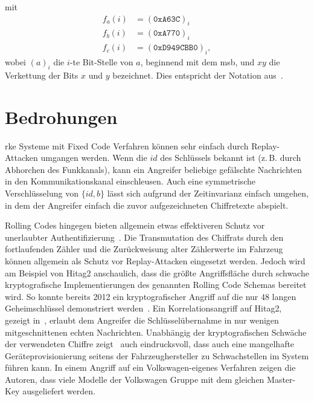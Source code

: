 %
mit
%
\begin{align*}
    f_{a}(i) & = {(\mathtt{0xA63C})}_{i}         \\
    f_{b}(i) & = {(\mathtt{0xA770})}_{i}         \\
    f_{c}(i) & = {(\mathtt{0xD949CBB0})}_{i} {,}
\end{align*}
%
wobei \({(a)}_{i}\) die \(i\)-te Bit-Stelle von \(a\), beginnend mit dem \gls{msb}, und \(x y\) die Verkettung der Bits \(x\) und \(y\) bezeichnet. Dies entspricht der Notation aus~\cite{Garcia2016,Verdult2015}.

\section{Bedrohungen}

\Gls{rke} Systeme mit \foreignlanguage{english}{Fixed Code} Verfahren können sehr einfach durch \foreignlanguage{english}{Replay}-Attacken umgangen werden. Wenn die \(\mathit{id}\) des Schlüssels bekannt ist (z.\,B. durch Abhorchen des Funkkanals), kann ein Angreifer beliebige gefälschte Nachrichten in den Kommunikationskanal einschleusen. Auch eine symmetrische Verschlüsselung von \( \{ \mathit{id}, b \} \) lässt sich aufgrund der Zeitinvarianz einfach umgehen, in dem der Angreifer einfach die zuvor aufgezeichneten Chiffretexte abspielt.

\foreignlanguage{english}{Rolling Codes} hingegen bieten allgemein etwas effektiveren Schutz vor unerlaubter Authentifizierung~\cite{Garcia2016}. Die Transmutation des Chiffrats durch den fortlaufenden Zähler und die Zurückweisung alter Zählerwerte im Fahrzeug können allgemein als Schutz vor \foreignlanguage{english}{Replay}-Attacken eingesetzt werden. Jedoch wird am Beispiel von Hitag2 anschaulich, dass die größte Angriffsfläche durch schwache kryptografische Implementierungen des genannten \foreignlanguage{english}{Rolling Code} Schemas bereitet wird. So konnte bereits 2012 ein kryptografischer Angriff auf die nur \SI{48}{\bit} langen Geheimschlüssel demonstriert werden~\cite{Verdult2012,Verdult2015}. Ein Korrelationsangriff auf Hitag2, gezeigt in~\cite{Garcia2016}, erlaubt dem Angreifer die Schlüsselübernahme in nur wenigen mitgeschnittenen echten Nachrichten. Unabhängig der kryptografischen Schwäche der verwendeten Chiffre zeigt~\cite{Garcia2016} auch eindrucksvoll, dass auch eine mangelhafte Geräteprovisionierung seitens der Fahrzeughersteller zu Schwachstellen im System führen kann. In einem Angriff auf ein Volkswagen-eigenes Verfahren zeigen die Autoren, dass viele Modelle der Volkswagen Gruppe mit dem gleichen Master-Key ausgeliefert werden.

